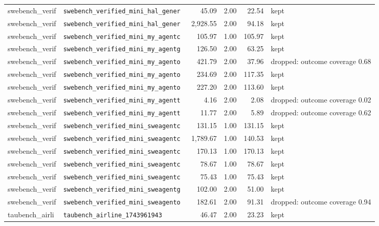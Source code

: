 {\begin{longtable}{llrrrl}
swebench\_verif & \texttt{\scriptsize swebench\_verified\_mini\_hal\_gener~} & 45.09 & 2.00 & 22.54 & kept \\
swebench\_verif & \texttt{\scriptsize swebench\_verified\_mini\_hal\_gener~} & 2,928.55 & 2.00 & 94.18 & kept \\
swebench\_verif & \texttt{\scriptsize swebench\_verified\_mini\_my\_agentc~} & 105.97 & 1.00 & 105.97 & kept \\
swebench\_verif & \texttt{\scriptsize swebench\_verified\_mini\_my\_agentg~} & 126.50 & 2.00 & 63.25 & kept \\
swebench\_verif & \texttt{\scriptsize swebench\_verified\_mini\_my\_agento~} & 421.79 & 2.00 & 37.96 & dropped: outcome coverage 0.68 \\
swebench\_verif & \texttt{\scriptsize swebench\_verified\_mini\_my\_agento~} & 234.69 & 2.00 & 117.35 & kept \\
swebench\_verif & \texttt{\scriptsize swebench\_verified\_mini\_my\_agento~} & 227.20 & 2.00 & 113.60 & kept \\
swebench\_verif & \texttt{\scriptsize swebench\_verified\_mini\_my\_agentt~} & 4.16 & 2.00 & 2.08 & dropped: outcome coverage 0.02 \\
swebench\_verif & \texttt{\scriptsize swebench\_verified\_mini\_my\_agentt~} & 11.77 & 2.00 & 5.89 & dropped: outcome coverage 0.62 \\
swebench\_verif & \texttt{\scriptsize swebench\_verified\_mini\_sweagentc~} & 131.15 & 1.00 & 131.15 & kept \\
swebench\_verif & \texttt{\scriptsize swebench\_verified\_mini\_sweagentc~} & 1,789.67 & 1.00 & 140.53 & kept \\
swebench\_verif & \texttt{\scriptsize swebench\_verified\_mini\_sweagentc~} & 170.13 & 1.00 & 170.13 & kept \\
swebench\_verif & \texttt{\scriptsize swebench\_verified\_mini\_sweagentc~} & 78.67 & 1.00 & 78.67 & kept \\
swebench\_verif & \texttt{\scriptsize swebench\_verified\_mini\_sweagentc~} & 75.43 & 1.00 & 75.43 & kept \\
swebench\_verif & \texttt{\scriptsize swebench\_verified\_mini\_sweagentg~} & 102.00 & 2.00 & 51.00 & kept \\
swebench\_verif & \texttt{\scriptsize swebench\_verified\_mini\_sweagento~} & 182.61 & 2.00 & 91.31 & dropped: outcome coverage 0.94 \\
taubench\_airli & \texttt{\scriptsize taubench\_airline\_1743961943} & 46.47 & 2.00 & 23.23 & kept \\

\end{longtable}}
